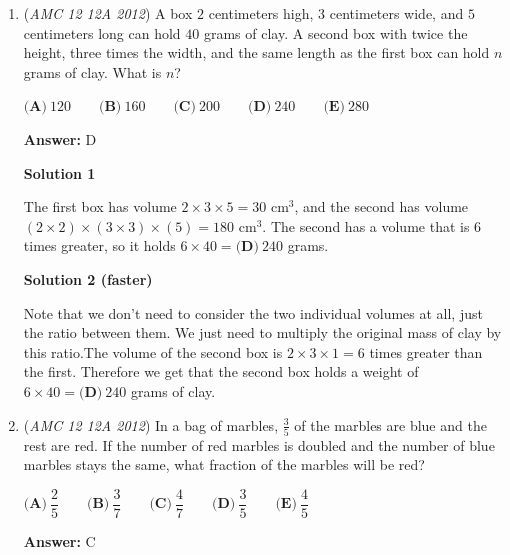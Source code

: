 \begin{enumerate}
 



\textbf{Solution 3}

Since Cagney frosts $3$ cupcakes a minute, and Lacey frosts $2$ cupcakes a minute, they together frost $3+2=5$ cupcakes a minute. Therefore, in $5$ minutes, they frost $5\times5 = 25 \Rightarrow \boxed{\textbf{(D)}}$



	\item (\textit{AMC 12 12A 2012}) A box $2$ centimeters high, $3$ centimeters wide, and $5$ centimeters long can hold $40$ grams of clay.  A second box with twice the height, three times the width, and the same length as the first box can hold $n$ grams of clay.  What is $n$?


 $\textbf{(A)}\ 120\qquad\textbf{(B)}\ 160\qquad\textbf{(C)}\ 200\qquad\textbf{(D)}\ 240\qquad\textbf{(E)}\ 280$

 \textbf{Answer: }D



\textbf{Solution 1}

The first box has volume $2\times3\times5=30\text{ cm}^3$, and the second has volume $(2\times2)\times(3\times3)\times(5)=180\text{ cm}^3$.  The second has a volume that is $6$ times greater, so it holds $6\times40=\boxed{\textbf{(D)}\ 240}$ grams.

 



\textbf{Solution 2 (faster)}

Note that we don't need to consider the two individual volumes at all, just the ratio between them. We just need to multiply the original mass of clay by this ratio.The volume of the second box is $2\times3\times1 = 6$ times greater than the first. Therefore we get that the second box holds a weight of $6\times 40=\boxed{\textbf{(D)}\ 240}$ grams of clay.

 


	\item (\textit{AMC 12 12A 2012}) In a bag of marbles, $\frac{3}{5}$ of the marbles are blue and the rest are red.  If the number of red marbles is doubled and the number of blue marbles stays the same, what fraction of the marbles will be red?


 $\textbf{(A)}\ \dfrac{2}{5} \qquad\textbf{(B)}\ \dfrac{3}{7} \qquad\textbf{(C)}\ \dfrac{4}{7} \qquad\textbf{(D)}\ \dfrac{3}{5} \qquad\textbf{(E)}\ \dfrac{4}{5}$

 \textbf{Answer: }C




\end{enumerate}

